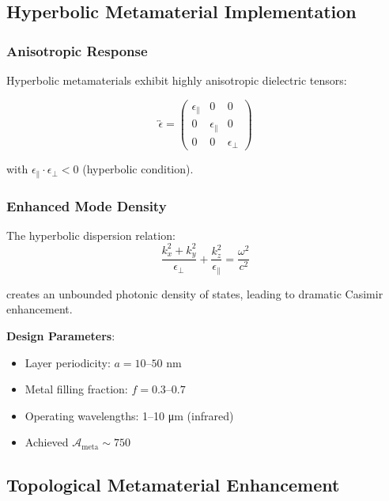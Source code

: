 \subsection{Hyperbolic Metamaterial Implementation}

\subsubsection{Anisotropic Response}

Hyperbolic metamaterials exhibit highly anisotropic dielectric tensors:

\begin{equation}
\overleftrightarrow{\epsilon} = \begin{pmatrix}
\epsilon_{\parallel} & 0 & 0 \\
0 & \epsilon_{\parallel} & 0 \\
0 & 0 & \epsilon_{\perp}
\end{pmatrix}
\end{equation}

with $\epsilon_{\parallel} \cdot \epsilon_{\perp} < 0$ (hyperbolic condition).

\subsubsection{Enhanced Mode Density}

The hyperbolic dispersion relation:
\begin{equation}
\frac{k_x^2 + k_y^2}{\epsilon_{\perp}} + \frac{k_z^2}{\epsilon_{\parallel}} = \frac{\omega^2}{c^2}
\end{equation}

creates an unbounded photonic density of states, leading to dramatic Casimir enhancement.

\textbf{Design Parameters}:
\begin{itemize}
\item Layer periodicity: $a = 10$--$50$ nm
\item Metal filling fraction: $f = 0.3$--$0.7$
\item Operating wavelengths: 1--10 μm (infrared)
\item Achieved $\mathcal{A}_{\text{meta}} \sim 750$
\end{itemize}

\subsection{Topological Metamaterial Enhancement}

